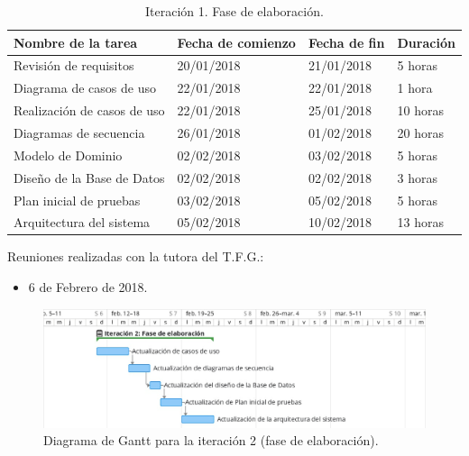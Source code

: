 \documentclass[twoside]{report}
\begin{document}
\begin{table}[H]
\centering
\begin{tabular}{|l|l|l|l|}
\hline
Nombre de la tarea          & Fecha de comienzo & Fecha de fin & Duración \\ \hline
Revisión de requisitos      & 20/01/2018        & 21/01/2018   & 5 horas   \\ \hline
Diagrama de casos de uso    & 22/01/2018        & 22/01/2018   & 1 hora   \\ \hline
Realización de casos de uso & 22/01/2018        & 25/01/2018   & 10 horas  \\ \hline
Diagramas de secuencia      & 26/01/2018        & 01/02/2018   & 20 horas  \\ \hline
Modelo de Dominio 			& 02/02/2018        & 03/02/2018   & 5 horas    \\ \hline
Diseño de la Base de Datos  & 02/02/2018        & 02/02/2018   & 3 horas   \\ \hline
Plan inicial de pruebas     & 03/02/2018        & 05/02/2018   & 5 horas   \\ \hline
Arquitectura del sistema    & 05/02/2018        & 10/02/2018   & 13 horas   \\ \hline
\end{tabular}
\caption{Iteración 1. Fase de elaboración.}
\end{table}

Reuniones realizadas con la tutora del T.F.G.:
\begin{itemize}
\item 6 de Febrero de 2018.
\end{itemize}


\begin{figure}[h]
\begin{center}
\includegraphics[width=\textwidth]{images/gantt/ite2}
\caption{Diagrama de Gantt para la iteración 2 (fase de elaboración).}
\end{center}
\end{figure}
\end{document}
